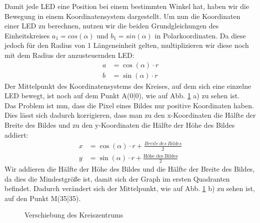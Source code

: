\documentclass [a4paper, 11pt] {article}
\begin{document}
Damit jede LED eine Position bei einem bestimmten Winkel hat, haben wir die Bewegung in einem Koordinatensystem dargestellt. Um nun die Koordinaten einer LED zu berechnen, nutzen wir die beiden Grundgleichungen des Einheitskreises $a_1 = cos(\alpha)$ und
$b_1 = sin(\alpha)$ in Polarkoordinaten. Da diese jedoch für den Radius von 1 Längeneinheit gelten, multiplizieren wir diese noch mit dem Radius der anzusteuernden LED:
\begin{align}
a &= \cos (\alpha) \cdot r \\
b &= \sin (\alpha) \cdot r 
\end{align}
Der Mittelpunkt des Koordinatensystems des Kreises, auf dem sich eine einzelne LED bewegt, ist noch auf dem Punkt A(0\big|0), wie auf Abb. \ref{dia} a) zu sehen ist. \\
Das Problem ist nun, dass die Pixel eines Bildes nur positive Koordinaten haben. Dies lässt sich dadurch korrigieren, dass man zu den x-Koordinaten die Hälfte der Breite des Bildes und zu den y-Koordinaten die Hälfte der Höhe des Bildes addiert:
\begin{align}
x &= \cos (\alpha) \cdot r + \frac{Breite \ des \ Bildes}{2} \\
y &= \sin (\alpha) \cdot r +  \frac{\text{Höhe\ des\ Bildes}}{2}
\end{align}
Wir addieren die Hälfte der Höhe des Bildes und die Hälfte der Breite des Bildes, da dies die Mindestgröße ist, damit sich der Graph im ersten Quadranten befindet. Dadurch verändert sich der Mittelpunkt, wie auf Abb. \ref{dia} b) zu sehen ist, auf den Punkt M(35\big|35).
\begin{figure}[H]
\centering
{}
\hspace{0.15\textwidth} 
\caption{Verschiebung des Kreiszentrums}
\label{dia}
\end{figure}
\end{document}

